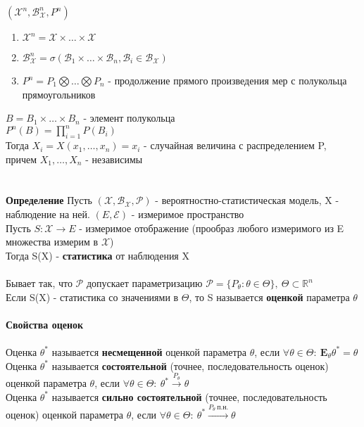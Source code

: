 \documentclass[25pt]{article}
\begin{document}
$(\mathcal{X}^n, \mathcal{B}_\mathcal{X}^n, P^n)$
\begin{enumerate}
    \item $\mathcal{X}^n = \mathcal{X}\times\dots\times\mathcal{X}$
    \item $\mathcal{B}_\mathcal{X}^n = \sigma(\mathcal{B}_1\times\dots\times\mathcal{B}_n, \mathcal{B}_i \in \mathcal{B}_\mathcal{X})$
    \item $P^n = P_1\bigotimes\dots\bigotimes P_n$ - продолжение прямого произведения мер с полукольца прямоугольников
\end{enumerate}
$B = B_1\times\dots\times B_n$ - элемент полукольца \\
$P^n(B) = \prod_{i=1}^n P(B_i)$ \\
Тогда $X_i = X(x_1,\dots,x_n) = x_i$ - случайная величина с распределением P, причем $X_1,\dots,X_n$ - независимы \\
\\
\\
\textbf{Определение} Пусть $(\mathcal{X}, \mathcal{B}_\mathcal{X}, \mathcal{P})$ - вероятностно-статистическая модель, X - наблюдение на ней. $(E, \mathcal{E})$ - измеримое пространство
\\
Пусть $S : \mathcal{X} \rightarrow E$ - измеримое отображение (прообраз любого измеримого из E множества измерим в $\mathcal{X}$) \\
Тогда S(X) - \textbf{статистика} от наблюдения X\\ \\
Бывает так, что $\mathcal{P}$ допускает параметризацию $\mathcal{P} = \{ P_\theta : \theta \in \Theta \},\ \Theta \subset \mathbb{R}^n$\\
Если S(X) - статистика со значениями в $\Theta$, то S называется \textbf{оценкой} параметра $\theta$ \\
\\
\textbf{Свойства оценок}\\
\\
Оценка $\theta^*$ называется \textbf{несмещенной} оценкой параметра $\theta$, если $\forall \theta \in \Theta: \ \mathbf{E}_\theta\theta^* = \theta$
\\
Оценка $\theta^*$ называется \textbf{состоятельной} (точнее, последовательность оценок) оценкой параметра $\theta$, если $\forall \theta \in \Theta: \ \theta^* \xrightarrow{P_\theta} \theta$
\\
Оценка $\theta^*$ называется \textbf{сильно состоятельной} (точнее, последовательность оценок) оценкой параметра $\theta$, если $\forall \theta \in \Theta: \ \theta^* \xrightarrow{P_\theta\ \text{п.н.}} \theta$ 
\end{document}
